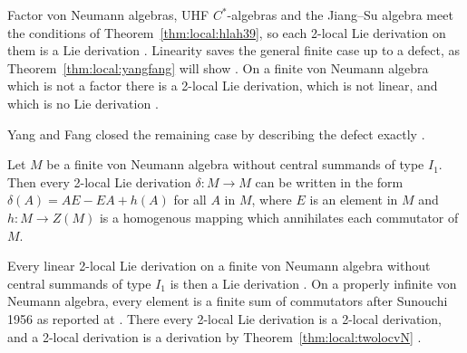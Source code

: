 Factor von Neumann algebras, UHF $C^*$-algebras and the Jiang--Su algebra
meet the conditions of Theorem~\ref{thm:local:hlah39}, so each 2-local Lie
derivation on them is a Lie derivation
\cite[Corollaries~3.10 to~3.12, p.~729]{HeLiAnHuang2018}. Linearity saves
the general finite case up to a defect, as Theorem~\ref{thm:local:yangfang}
will show \cite[p.~244]{YangFang2019}. On a finite von
Neumann algebra which is not a factor there is a 2-local Lie derivation,
which is not linear, and which is no Lie derivation
\cite[Example~3.13, p.~729]{HeLiAnHuang2018}.

Yang and Fang closed the remaining case by describing the defect exactly
\cite[p.~244]{YangFang2019}.

\begin{theorem}\label{thm:local:yangfang}
Let $M$ be a finite von Neumann algebra without central summands of type
$I_1$. Then every 2-local Lie derivation $\delta\colon M\to M$ can be
written in the form $\delta(A)=AE-EA+h(A)$ for all $A$ in $M$, where $E$
is an element in $M$ and $h\colon M\to Z(M)$ is a homogenous mapping which
annihilates each commutator of $M$.
\end{theorem}

Every linear 2-local Lie derivation on a finite von Neumann algebra
without central summands of type $I_1$ is then a Lie derivation
\cite[Corollary~2.6, p.~250]{YangFang2019}. On a properly infinite von
Neumann algebra, every element is a finite sum of commutators after
Sunouchi 1956 as reported at \cite[p.~244]{YangFang2019}. There every
2-local Lie derivation is a 2-local derivation, and a 2-local derivation
is a derivation by Theorem~\ref{thm:local:twolocvN}
\cite[p.~244]{YangFang2019}.
